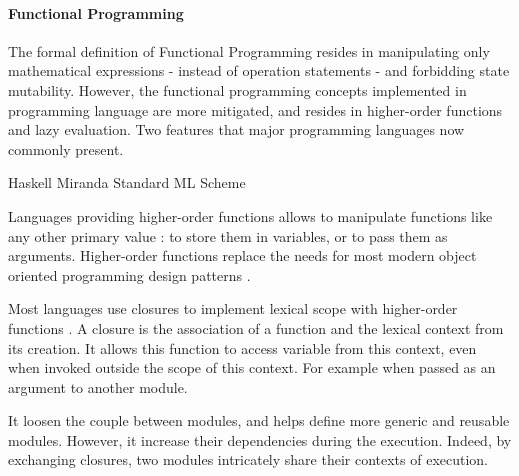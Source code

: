 




\paragraph{Functional Programming} \label{chapter3:software-design:programming-models:functional-programming}


The formal definition of Functional Programming resides in manipulating only mathematical expressions - instead of operation statements - and forbidding state mutability.
However, the functional programming concepts implemented in programming language are more mitigated, and resides in higher-order functions and lazy evaluation.
Two features that major programming languages now commonly present.

Haskell \cite{Hudak1992}
Miranda \cite{Turner1986}
Standard ML \cite{Milner1997}
Scheme \cite{Rees1986}

Languages providing higher-order functions allows to manipulate functions like any other primary value : to store them in variables, or to pass them as arguments.
Higher-order functions replace the needs for most modern object oriented programming design patterns .

Most languages use closures to implement lexical scope with higher-order functions \cite{Sussman1998}.
A closure is the association of a function and the lexical context from its creation.
It allows this function to access variable from this context, even when invoked outside the scope of this context.
For example when passed as an argument to another module.

It loosen the couple between modules, and helps define more generic and reusable modules.
However, it increase their dependencies during the execution.
Indeed, by exchanging closures, two modules intricately share their contexts of execution.



